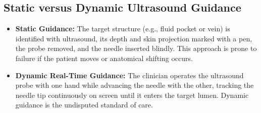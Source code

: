 \documentclass[11pt,a4paper]{article}
\begin{document}
\subsection{Static versus Dynamic Ultrasound Guidance}
\begin{itemize}[leftmargin=2em]
    \item \textbf{Static Guidance:} The target structure (e.g., fluid pocket or vein) is identified with ultrasound, its depth and skin projection marked with a pen, the probe removed, and the needle inserted blindly. This approach is prone to failure if the patient moves or anatomical shifting occurs.
    \item \textbf{Dynamic Real-Time Guidance:} The clinician operates the ultrasound probe with one hand while advancing the needle with the other, tracking the needle tip continuously on screen until it enters the target lumen. Dynamic guidance is the undisputed standard of care.
\end{itemize}
\end{document}
